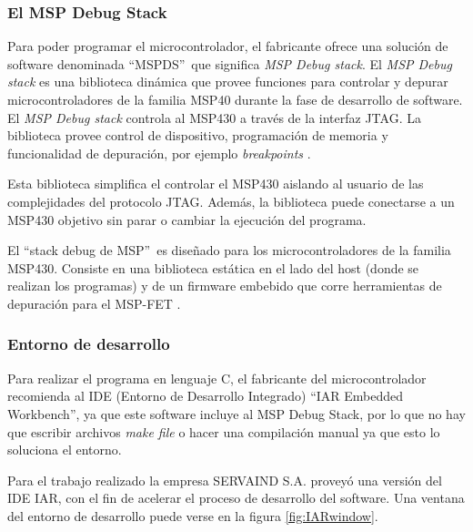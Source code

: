\subsubsection{ El MSP Debug Stack}

Para poder programar el microcontrolador, el fabricante ofrece una solución de software denominada \textquotedblleft MSPDS\textquotedblright \ que significa \textit{MSP Debug stack}. El \textit{MSP Debug stack} es una biblioteca dinámica que provee funciones para controlar y depurar microcontroladores de la familia MSP40 durante la fase de desarrollo de software. El \textit{MSP Debug stack} controla al MSP430 a través de la interfaz JTAG. La biblioteca provee control de dispositivo, programación de memoria y funcionalidad de depuración, por ejemplo \textit{breakpoints} \cite{GuideMSPStack}.

Esta biblioteca simplifica el controlar el MSP430 aislando al usuario de las complejidades del protocolo JTAG. Además, la biblioteca puede conectarse a un MSP430 objetivo sin parar o cambiar la ejecución del programa.

El \textquotedblleft stack debug de MSP\textquotedblright \ es diseñado para los microcontroladores de la familia MSP430. Consiste en una biblioteca estática en el lado del host (donde se realizan los programas) y de un firmware embebido que corre herramientas de depuración para el MSP-FET \cite{GuideMSPStack}.

\subsubsection{Entorno de desarrollo}


Para realizar el programa en lenguaje C, el fabricante del microcontrolador recomienda al IDE (Entorno de Desarrollo Integrado) \textquotedblleft IAR Embedded Workbench\textquotedblright , ya que este software incluye al  MSP Debug Stack, por lo que no hay que escribir archivos \textit{ make file} o hacer una compilación manual ya que esto lo soluciona el entorno.

Para el trabajo realizado la empresa SERVAIND S.A. proveyó una versión del IDE IAR, con el fin de acelerar el proceso de desarrollo del software. Una ventana del entorno de desarrollo puede verse en la figura \ref{fig:IARwindow}.

